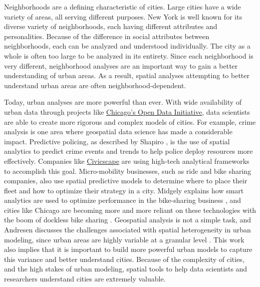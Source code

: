 \documentclass[times new roman,12pt]{article}
\begin{document}
Neighborhoods are a defining characteristic of cities. Large cities have a wide variety of areas, all serving different purposes. New York is well known for its diverse variety of neighborhoods, each having different attributes and personalities. Because of the difference in social attributes between neighborhoods, each can be analyzed and understood individually. The city as a whole is often too large to be analyzed in its entirety. Since each neighborhood is very different, neighborhood analyses are an important way to gain a better understanding of urban areas. As a result, spatial analyses attempting to better understand urban areas are often neighborhood-dependent.

Today, urban analyses are more powerful than ever. With wide availability of urban data through projects like \href{https://data.cityofchicago.org}{Chicago's Open Data Initiative}, data scientists are able to create more rigorous and complex models of cities. For example, crime analysis is one area where geospatial data science has made a considerable impact. Predictive policing, as described by Shapiro \cite{shapiro_reform_2017}, is the use of spatial analytics to predict crime events and trends to help police deploy resources more effectively. Companies like \href{https://www.civicscape.com}{Civicscape} are using high-tech analytical frameworks to accomplish this goal. Micro-mobility businesses, such as ride and bike sharing companies, also use spatial predictive models to determine where to place their fleet and how to optimize their strategy in a city. Midgely explains how smart analytics are used to optimize performance in the bike-sharing business \cite{midgley_role_2009}, and cities like Chicago are becoming more and more reliant on these technologies with the boom of dockless bike sharing \cite{claffey_city_2018}. Geospatial analysis is not a simple task, and Andresen discusses the challenges associated with spatial heterogeneity in urban modeling, since urban areas are highly variable at a granular level \cite{andresen_spatial_2013}. This work also implies that it is important to build more powerful urban models to capture this variance and better understand cities. Because of the complexity of cities, and the high stakes of urban modeling, spatial tools to help data scientists and researchers understand cities are extremely valuable.
\end{document}
